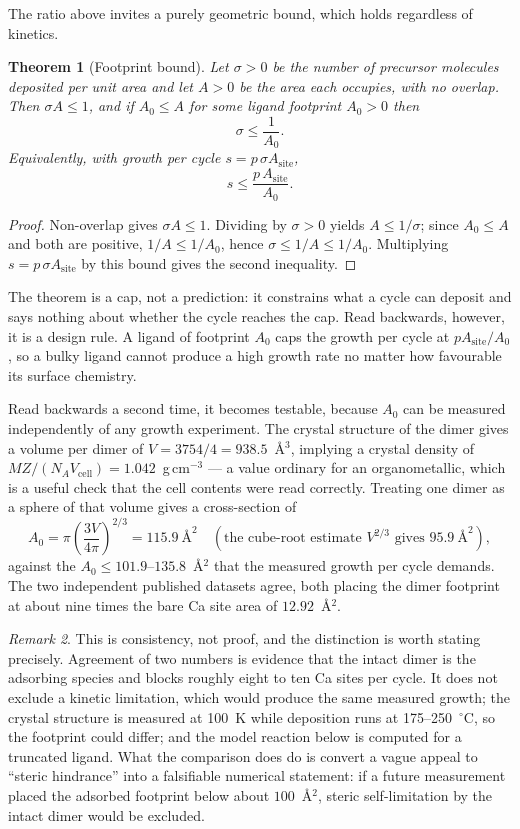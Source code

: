 \documentclass[11pt,a4paper]{article}
\theoremstyle{plain}
\newtheorem{theorem}{Theorem}[section]
\theoremstyle{definition}
\theoremstyle{remark}
\newtheorem{remark}[theorem]{Remark}
\begin{document}
The ratio above invites a purely geometric bound, which holds regardless of
kinetics.

\begin{theorem}[Footprint bound]
\label{thm:footprint}
Let $\sigma>0$ be the number of precursor molecules deposited per unit area and
let $A>0$ be the area each occupies, with no overlap. Then $\sigma A\le1$, and
if $A_0\le A$ for some ligand footprint $A_0>0$ then
\[
\sigma \le \frac{1}{A_0}.
\]
Equivalently, with growth per cycle $s = p\,\sigma A_{\mathrm{site}}$,
\[
s \le \frac{p\,A_{\mathrm{site}}}{A_0}.
\]
\end{theorem}
\begin{proof}
Non-overlap gives $\sigma A\le1$. Dividing by $\sigma>0$ yields
$A\le1/\sigma$; since $A_0\le A$ and both are positive,
$1/A\le1/A_0$, hence $\sigma\le1/A\le1/A_0$. Multiplying
$s=p\,\sigma A_{\mathrm{site}}$ by this bound gives the second inequality.
\end{proof}

The theorem is a cap, not a prediction: it constrains what a cycle can deposit
and says nothing about whether the cycle reaches the cap. Read backwards,
however, it is a design rule. A ligand of footprint $A_0$ caps the growth per
cycle at $pA_{\mathrm{site}}/A_0$, so a bulky ligand cannot produce a high
growth rate no matter how favourable its surface chemistry.

Read backwards a second time, it becomes testable, because $A_0$ can be
measured independently of any growth experiment. The crystal structure of the
dimer \citep{Kim2016} gives a volume per dimer of
$V=3754/4=938.5$~\AA$^3$, implying a crystal density of
$MZ/(N_A V_{\mathrm{cell}})=1.042$~g\,cm$^{-3}$ --- a value ordinary for an
organometallic, which is a useful check that the cell contents were read
correctly. Treating one dimer as a sphere of that volume gives a cross-section
of
\[
A_0 = \pi\left(\frac{3V}{4\pi}\right)^{2/3} = 115.9\ \text{\AA}^2
  \quad (\text{the cube-root estimate } V^{2/3} \text{ gives } 95.9\ \text{\AA}^2),
\]
against the $A_0\le101.9$--$135.8$~\AA$^2$ that the measured growth per cycle
demands. The two independent published datasets agree, both placing the dimer
footprint at about nine times the bare Ca site area of $12.92$~\AA$^2$.

\begin{remark}
This is consistency, not proof, and the distinction is worth stating precisely.
Agreement of two numbers is evidence that the intact dimer is the adsorbing
species and blocks roughly eight to ten Ca sites per cycle. It does not exclude
a kinetic limitation, which would produce the same measured growth; the crystal
structure is measured at 100~K while deposition runs at 175--250~$^\circ$C, so
the footprint could differ; and the model reaction below is computed for a
truncated ligand. What the comparison does do is convert a vague appeal to
``steric hindrance'' into a falsifiable numerical statement: if a future
measurement placed the adsorbed footprint below about $100$~\AA$^2$, steric
self-limitation by the intact dimer would be excluded.
\end{remark}
\end{document}
